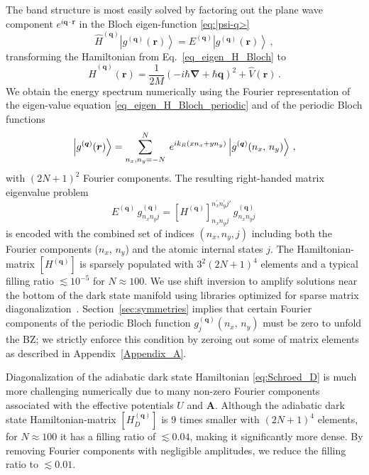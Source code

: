 \documentclass[aps,pra,twocolumn,showpacs,superscriptaddress,floatfix,longbibliography]{revtex4-1}
\def\Udd{U}
\def\Add{{\mathbf A}}
\begin{document}
The band structure is most easily solved by factoring out the plane wave component $e^{i \boldsymbol{q} \cdot \boldsymbol{r}}$ in the Bloch eigen-function \eqref{eq:|psi-q>}
\begin{equation}
\hat{H}^{(\boldsymbol{q})} \left|g^{(\boldsymbol{q})}(\boldsymbol{r})\right\rangle = E^{(\boldsymbol{q})} \left|g^{(\boldsymbol{q})}(\boldsymbol{r})\right\rangle \, , \label{eq_eigen_H_Bloch_periodic}
\end{equation}
transforming the Hamiltonian from Eq.~\eqref{eq_eigen_H_Bloch} to
\begin{equation}
\label{eq_H_q}
\hat{H}^{(\boldsymbol{q})} (\boldsymbol{r})  = \frac{1}{2M}  \left( -i \hbar \boldsymbol{\nabla} + \hbar \boldsymbol{q} \right)^{2} +  \hat{V}(\boldsymbol{r})
 \, .
\end{equation}
We obtain the energy spectrum numerically using the Fourier representation of the eigen-value equation \eqref{eq_eigen_H_Bloch_periodic} and of the periodic Bloch functions
%
\begin{equation}\label{eq:Fourier_decompose_2D}
\ket{g^{(\boldsymbol{q})}(\boldsymbol{r})} = \sum_{n_x,n_y=-N}^{N} \: e^{i k_R (x n_x + y n_y)} \ket{g^{(\boldsymbol{q})} (n_x, \, n_y)} \, ,
\end{equation}
%
with $(2N+1)^2$ Fourier components.
The resulting right-handed matrix eigenvalue problem
%
\begin{equation}\label{eq:diagonalize_2D}
E^{(\boldsymbol{q})} \,  g^{(\boldsymbol{q})}_{n_x n_y j} = \left[ H^{(\boldsymbol{q})}  \right]^{n^{\prime}_x n^{\prime}_y j'}_{n_x n_y j} \, g^{(\boldsymbol{q})}_{n_x n_y j} \,
\end{equation}
%
is encoded with the combined set of indices $(n_x, n_y, j)$ including both the Fourier components ($n_x$, $n_y$) and the atomic internal states $j$.
The Hamiltonian-matrix $[H^{(\boldsymbol{q})}]$ is sparsely populated with $3^2(2N+1)^{4}$ elements and a typical filling ratio $\lesssim  10^{-5}$ for $N \approx 100$.
We use shift inversion to amplify solutions near the bottom of the dark state manifold using libraries optimized for sparse matrix diagonalization~\cite{ARPACK, scipy}.
Section~\ref{sec:symmetries} implies that certain Fourier components of the periodic Bloch function $g_j^{(\boldsymbol{q})} (n_x, \, n_y)$ must be zero to unfold the BZ; we strictly enforce this condition by zeroing out some of matrix elements as described in Appendix~\ref{Appendix_A}.

Diagonalization of the adiabatic dark state Hamiltonian \eqref{eq:Schroed_D} is much more challenging numerically due to many non-zero Fourier components associated with the effective potentials $\Udd$ and $\Add$. Although the adiabatic dark state Hamiltonian-matrix $[H^{(\boldsymbol{q})}_D]$ is 9 times smaller with $(2N+1)^{4}$ elements, for $N \approx 100$ it has a filling ratio of $\lesssim 0.04$, making it significantly more dense.
By removing Fourier components with negligible amplitudes, we reduce the filling ratio to $\lesssim 0.01$.
\end{document}
